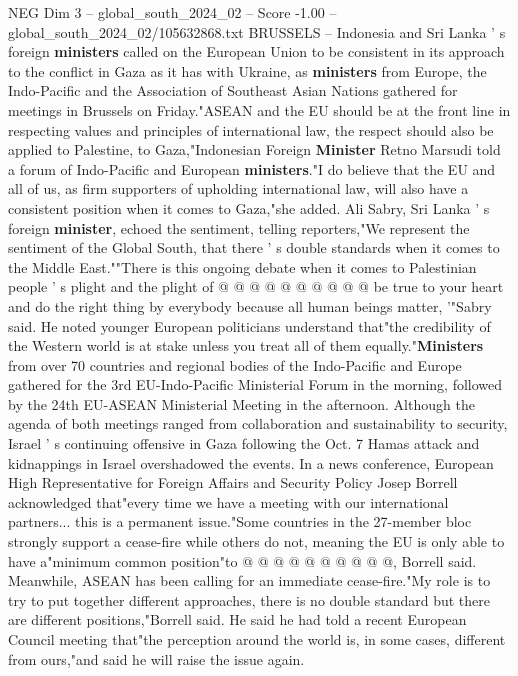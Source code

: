 \begin{textsample}{NEG Dim 3 – global\_south\_2024\_02 – Score -1.00 – global\_south\_2024\_02/105632868.txt}  \label{ex:f3_neg_084}
BRUSSELS -- Indonesia and Sri Lanka ' s foreign \textbf{ministers} called on the European Union to be consistent in its approach to the conflict in Gaza as it has with Ukraine, as \textbf{ministers} from Europe, the Indo-Pacific and the Association of Southeast Asian Nations gathered for meetings in Brussels on Friday."ASEAN and the EU should be at the front line in respecting values and principles of international law, the respect should also be applied to Palestine, to Gaza,"Indonesian Foreign \textbf{Minister} Retno Marsudi told a forum of Indo-Pacific and European \textbf{ministers}."I do believe that the EU and all of us, as firm supporters of upholding international law, will also have a consistent position when it comes to Gaza,"she added.
Ali Sabry, Sri Lanka ' s foreign \textbf{minister}, echoed the sentiment, telling reporters,"We represent the sentiment of the Global South, that there ' s double standards when it comes to the Middle East.""There is this ongoing debate when it comes to Palestinian people ' s plight and the plight of @ @ @ @ @ @ @ @ @ @ be true to your heart and do the right thing by everybody because all human beings matter, '"Sabry said.
He noted younger European politicians understand that"the credibility of the Western world is at stake unless you treat all of them equally."\textbf{Ministers} from over 70 countries and regional bodies of the Indo-Pacific and Europe gathered for the 3rd EU-Indo-Pacific Ministerial Forum in the morning, followed by the 24th EU-ASEAN Ministerial Meeting in the afternoon.
Although the agenda of both meetings ranged from collaboration and sustainability to security, Israel ' s continuing offensive in Gaza following the Oct. 7 Hamas attack and kidnappings in Israel overshadowed the events.
In a news conference, European High Representative for Foreign Affairs and Security Policy Josep Borrell acknowledged that"every time we have a meeting with our international partners... this is a permanent issue."Some countries in the 27-member bloc strongly support a cease-fire while others do not, meaning the EU is only able to have a"minimum common position"to @ @ @ @ @ @ @ @ @ @, Borrell said.
Meanwhile, ASEAN has been calling for an immediate cease-fire."My role is to try to put together different approaches, there is no double standard but there are different positions,"Borrell said.
He said he had told a recent European Council meeting that"the perception around the world is, in some cases, different from ours,"and said he will raise the issue again.

\end{textsample}
